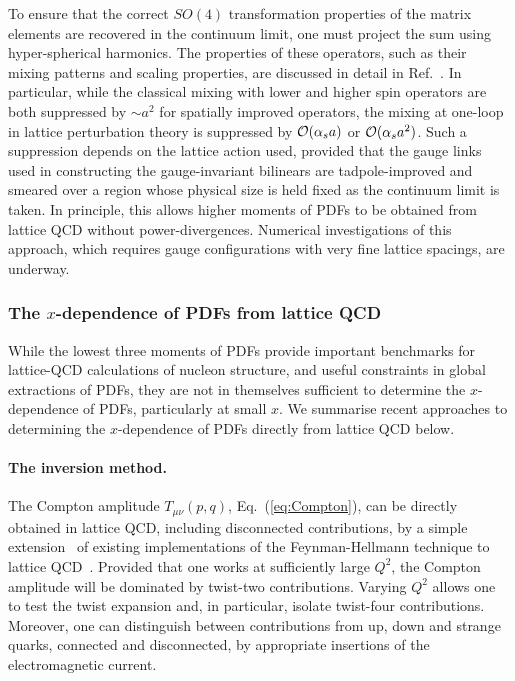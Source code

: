 To ensure that the correct $SO(4)$ transformation properties of the matrix 
elements are recovered in the continuum limit, one must project the sum using 
hyper-spherical harmonics.
%
The properties of these operators, such as their mixing patterns and scaling 
properties, are discussed in detail in Ref.~\cite{Davoudi:2012ya}.
%
In particular, while the classical mixing with lower and higher spin operators 
are both suppressed by $\sim a^2$ for spatially improved operators, the mixing 
at one-loop in lattice perturbation theory is suppressed by 
${\cal O}(\alpha_s a)$ or ${\cal O}(\alpha_s a^2)$.
%
Such a suppression depends on the lattice action used, provided that the 
gauge links used in constructing the gauge-invariant bilinears are 
tadpole-improved and smeared over a region whose physical size is held fixed 
as the continuum limit is taken. 
%
In principle, this allows higher moments of PDFs to be obtained from 
lattice QCD without power-divergences. 
%
Numerical investigations of this approach, which requires gauge configurations 
with very fine lattice spacings, are underway.

\subsubsection{The $x$-dependence of PDFs from lattice QCD}
\label{sec:xdependence}

While the lowest three moments of PDFs provide important benchmarks for 
lattice-QCD calculations of nucleon structure, and useful constraints in 
global extractions of PDFs, they are not in themselves sufficient to determine 
the $x$-dependence of PDFs, particularly at small $x$.
%
We summarise recent approaches to determining the $x$-dependence of PDFs 
directly from lattice QCD below.

\paragraph{The inversion method.} 
\label{Sec:InversionMethod}

The Compton amplitude $T_{\mu\nu}(p,q)$, Eq.~(\ref{eq:Compton}), can be
directly obtained in lattice QCD, including disconnected contributions,  
by a simple extension~\cite{Chambers:2017dov} of existing implementations 
of the Feynman-Hellmann technique to lattice 
QCD~\cite{Horsley:2012pz,Chambers:2014qaa,Chambers:2015bka}.
%
Provided that one works at sufficiently large $Q^2$, the Compton amplitude 
will be dominated by twist-two contributions.
%
Varying $Q^2$ allows one to test the twist expansion and, in particular, 
isolate twist-four contributions. 
%
Moreover, one can distinguish between contributions from up, down and strange 
quarks, connected and disconnected, by appropriate insertions of the 
electromagnetic current.

